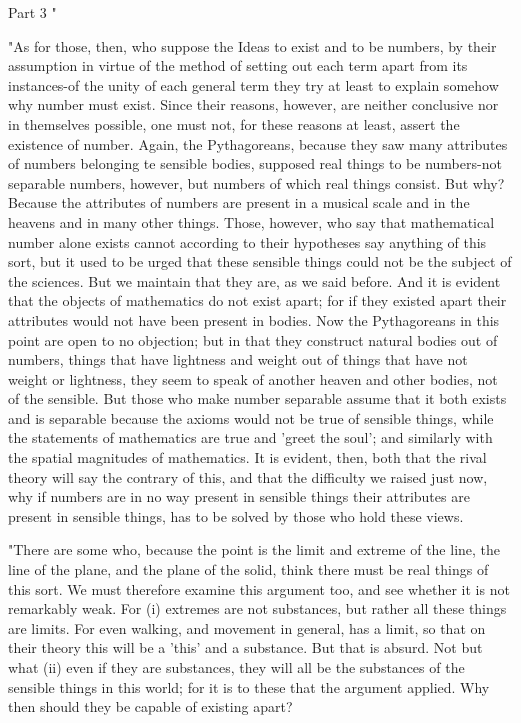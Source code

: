 Part 3 "

"As for those, then, who suppose the Ideas to exist and to be numbers,
by their assumption in virtue of the method of setting out each term
apart from its instances-of the unity of each general term they try
at least to explain somehow why number must exist. Since their reasons,
however, are neither conclusive nor in themselves possible, one must
not, for these reasons at least, assert the existence of number. Again,
the Pythagoreans, because they saw many attributes of numbers belonging
te sensible bodies, supposed real things to be numbers-not separable
numbers, however, but numbers of which real things consist. But why?
Because the attributes of numbers are present in a musical scale and
in the heavens and in many other things. Those, however, who say that
mathematical number alone exists cannot according to their hypotheses
say anything of this sort, but it used to be urged that these sensible
things could not be the subject of the sciences. But we maintain that
they are, as we said before. And it is evident that the objects of
mathematics do not exist apart; for if they existed apart their attributes
would not have been present in bodies. Now the Pythagoreans in this
point are open to no objection; but in that they construct natural
bodies out of numbers, things that have lightness and weight out of
things that have not weight or lightness, they seem to speak of another
heaven and other bodies, not of the sensible. But those who make number
separable assume that it both exists and is separable because the
axioms would not be true of sensible things, while the statements
of mathematics are true and 'greet the soul'; and similarly with the
spatial magnitudes of mathematics. It is evident, then, both that
the rival theory will say the contrary of this, and that the difficulty
we raised just now, why if numbers are in no way present in sensible
things their attributes are present in sensible things, has to be
solved by those who hold these views. 

"There are some who, because the point is the limit and extreme of
the line, the line of the plane, and the plane of the solid, think
there must be real things of this sort. We must therefore examine
this argument too, and see whether it is not remarkably weak. For
(i) extremes are not substances, but rather all these things are limits.
For even walking, and movement in general, has a limit, so that on
their theory this will be a 'this' and a substance. But that is absurd.
Not but what (ii) even if they are substances, they will all be the
substances of the sensible things in this world; for it is to these
that the argument applied. Why then should they be capable of existing
apart? 


